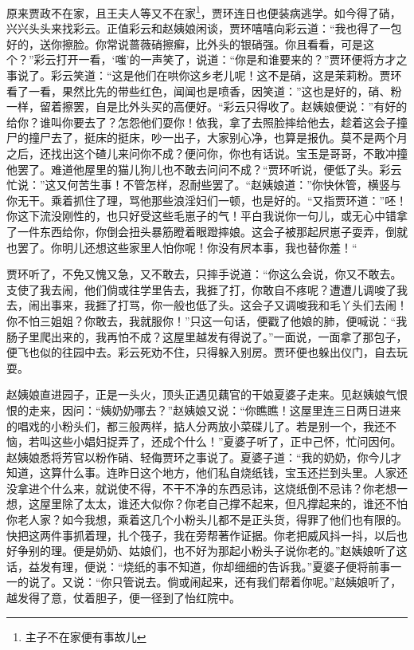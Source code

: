 \documentclass[12pt,oneside]{book}
\begin{document}
原来贾政不在家，且王夫人等又不在家\footnote{主子不在家便有事故儿}，贾环连日也便装病逃学。如今得了硝，兴兴头头来找彩云。正值彩云和赵姨娘闲谈，贾环嘻嘻向彩云道：“我也得了一包好的，送你擦脸。你常说蔷薇硝擦癣，比外头的银硝强。你且看看，可是这个？”彩云打开一看，‘嗤’的一声笑了，说道：“你是和谁要来的？”贾环便将方才之事说了。彩云笑道：“这是他们在哄你这乡老儿呢！这不是硝，这是茉莉粉。贾环看了一看，果然比先的带些红色，闻闻也是喷香，因笑道：”这也是好的，硝、粉一样，留着擦罢，自是比外头买的高便好。“彩云只得收了。赵姨娘便说：”有好的给你？谁叫你要去了？怎怨他们耍你！依我，拿了去照脸摔给他去，趁着这会子撞尸的撞尸去了，挺床的挺床，吵一出子，大家别心净，也算是报仇。莫不是两个月之后，还找出这个碴儿来问你不成？便问你，你也有话说。宝玉是哥哥，不敢冲撞他罢了。难道他屋里的猫儿狗儿也不敢去问问不成？“贾环听说，便低了头。彩云忙说：”这又何苦生事！不管怎样，忍耐些罢了。“赵姨娘道：”你快休管，横竖与你无干。乘着抓住了理，骂他那些浪淫妇们一顿，也是好的。“又指贾环道：”呸！你这下流没刚性的，也只好受这些毛崽子的气！平白我说你一句儿，或无心中错拿了一件东西给你，你倒会扭头暴筋瞪着眼蹬摔娘。这会子被那起屄崽子耍弄，倒就也罢了。你明儿还想这些家里人怕你呢！你没有屄本事，我也替你羞！“

贾环听了，不免又愧又急，又不敢去，只摔手说道：“你这么会说，你又不敢去。支使了我去闹，他们倘或往学里告去，我捱了打，你敢自不疼呢？遭遭儿调唆了我去，闹出事来，我捱了打骂，你一般也低了头。这会子又调唆我和毛丫头们去闹！你不怕三姐姐？你敢去，我就服你！”只这一句话，便戳了他娘的肺，便喊说：“我肠子里爬出来的，我再怕不成？这屋里越发有得说了。”一面说，一面拿了那包子，便飞也似的往园中去。彩云死劝不住，只得躲入别房。贾环便也躲出仪门，自去玩耍。

赵姨娘直进园子，正是一头火，顶头正遇见藕官的干娘夏婆子走来。见赵姨娘气恨恨的走来，因问：“姨奶奶哪去？”赵姨娘又说：“你瞧瞧！这屋里连三日两日进来的唱戏的小粉头们，都三般两样，掂人分两放小菜碟儿了。若是别一个，我还不恼，若叫这些小娼妇捉弄了，还成个什么！”夏婆子听了，正中己怀，忙问因何。赵姨娘悉将芳官以粉作硝、轻侮贾环之事说了。夏婆子道：“我的奶奶，你今儿才知道，这算什么事。连昨日这个地方，他们私自烧纸钱，宝玉还拦到头里。人家还没拿进个什么来，就说使不得，不干不净的东西忌讳，这烧纸倒不忌讳？你老想一想，这屋里除了太太，谁还大似你？你老自己撑不起来，但凡撑起来的，谁还不怕你老人家？如今我想，乘着这几个小粉头儿都不是正头货，得罪了他们也有限的。快把这两件事抓着理，扎个筏子，我在旁帮著作证据。你老把威风抖一抖，以后也好争别的理。便是奶奶、姑娘们，也不好为那起小粉头子说你老的。”赵姨娘听了这话，益发有理，便说：“烧纸的事不知道，你却细细的告诉我。”夏婆子便将前事一一的说了。又说：“你只管说去。倘或闹起来，还有我们帮着你呢。”赵姨娘听了，越发得了意，仗着胆子，便一径到了怡红院中。
\end{document}
